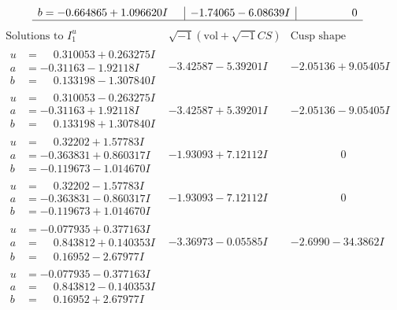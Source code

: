 \documentclass[1p]{elsarticle_modified}
\theoremstyle{definition}
\newcommand{\I}{\sqrt{-1}}
\begin{document}
$$\begin{array}{c|c|c}
\begin{aligned}
b &= -0.664865 + 1.096620 I\end{aligned}
 & -1.74065 - 6.08639 I & \phantom{-0.000000 } 0\\
 \hline 
 \end{array}$$\newpage$$\begin{array}{c|c|c}  
\text{Solutions to }I^u_{1}& \I (\text{vol} + \sqrt{-1}CS) & \text{Cusp shape}\\
 \hline 
\begin{aligned}
u &= \phantom{-}0.310053 + 0.263275 I \\
a &= -0.31163 - 1.92118 I \\
b &= \phantom{-}0.133198 - 1.307840 I\end{aligned}
 & -3.42587 - 5.39201 I & -2.05136 + 9.05405 I \\ \hline\begin{aligned}
u &= \phantom{-}0.310053 - 0.263275 I \\
a &= -0.31163 + 1.92118 I \\
b &= \phantom{-}0.133198 + 1.307840 I\end{aligned}
 & -3.42587 + 5.39201 I & -2.05136 - 9.05405 I \\ \hline\begin{aligned}
u &= \phantom{-}0.32202 + 1.57783 I \\
a &= -0.363831 + 0.860317 I \\
b &= -0.119673 - 1.014670 I\end{aligned}
 & -1.93093 + 7.12112 I & \phantom{-0.000000 } 0 \\ \hline\begin{aligned}
u &= \phantom{-}0.32202 - 1.57783 I \\
a &= -0.363831 - 0.860317 I \\
b &= -0.119673 + 1.014670 I\end{aligned}
 & -1.93093 - 7.12112 I & \phantom{-0.000000 } 0 \\ \hline\begin{aligned}
u &= -0.077935 + 0.377163 I \\
a &= \phantom{-}0.843812 + 0.140353 I \\
b &= \phantom{-}0.16952 - 2.67977 I\end{aligned}
 & -3.36973 - 0.05585 I & -2.6990 - 34.3862 I \\ \hline\begin{aligned}
u &= -0.077935 - 0.377163 I \\
a &= \phantom{-}0.843812 - 0.140353 I \\
b &= \phantom{-}0.16952 + 2.67977 I\end{aligned}

\end{array}$$
\end{document}
